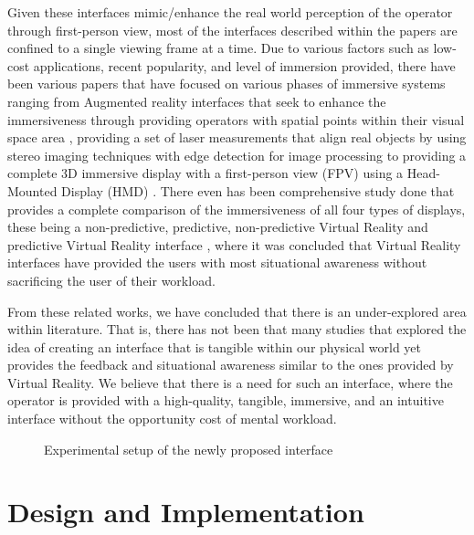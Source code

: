 \documentclass[conference]{IEEEtran}
\begin{document}
 Given these interfaces mimic/enhance the real world perception of the operator through first-person view, most of the interfaces described within the papers are confined to a single viewing frame at a time. Due to various factors such as low-cost applications, recent popularity, and level of immersion provided, there have been various papers that have focused on various phases of immersive systems ranging from Augmented reality interfaces that seek to enhance the immersiveness through providing operators with spatial points within their visual space area \cite{b17}, providing a set of laser measurements that align real objects by using stereo imaging techniques with edge detection for image processing \cite{b18} to providing a complete 3D immersive display with a first-person view (FPV) using a Head-Mounted Display (HMD) \cite{b19}. There even has been comprehensive study done that provides a complete comparison of the immersiveness of all four types of displays, these being a non-predictive, predictive, non-predictive Virtual Reality and predictive Virtual Reality interface \cite{b20}, where it was concluded that Virtual Reality interfaces have provided the users with most situational awareness without sacrificing the user of their workload.  

From these related works, we have concluded that there is an under-explored area within literature. That is, there has not been that many studies that explored the idea of creating an interface that is tangible within our physical world yet provides the feedback and situational awareness similar to the ones provided by Virtual Reality. We believe that there is a need for such an interface, where the operator is provided with a high-quality, tangible, immersive, and an intuitive interface without the opportunity cost of mental workload. 

\begin{figure}[h]

\caption{Experimental setup of the newly proposed interface}
\centering
\end{figure}

\section{Design and Implementation}
\end{document}
